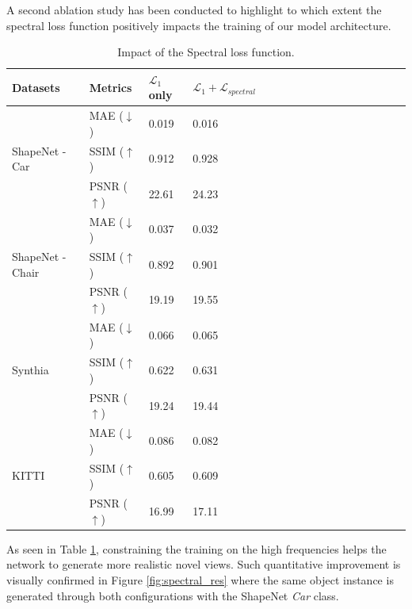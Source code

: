 A second ablation study has been conducted to highlight to which extent the spectral loss function positively impacts the training of our model architecture. 
\begin{table}[h!]
\begin{center}
\begin{tabular}{@{}||lllllllllllllllll@{}}
  \toprule
  Datasets & Metrics  &$\mathcal{L}_{1}$ only  &  $\mathcal{L}_{1}+\mathcal{L}_{spectral}$ &   \\
  \midrule
  \multirow{3}{*}{ShapeNet - Car \citep{chang2015shapenet}} & MAE ($\downarrow$) &\hfil 0.019 & \hfil  \cellcolor{red!25}0.016 \\
  & SSIM ($\uparrow$) & \hfil0.912 & \hfil \cellcolor{red!25}0.928\\
  & PSNR ($\uparrow$)& \hfil22.61 & \hfil \cellcolor{red!25}24.23\\
  \midrule
  \multirow{3}{*}{ShapeNet - Chair \citep{chang2015shapenet}} & MAE ($\downarrow$) & \hfil 0.037 & \hfil \cellcolor{red!25}0.032\\
  & SSIM ($\uparrow$)&\hfil 0.892 & \hfil \cellcolor{red!25}0.901 \\
  & PSNR ($\uparrow$) & \hfil 19.19 & \hfil \cellcolor{red!25}19.55 \\
  \midrule
  \multirow{3}{*}{Synthia \citep{ros2016synthia}} & MAE ($\downarrow$)& \hfil 0.066 & \hfil \cellcolor{red!25}0.065\\
  & SSIM ($\uparrow$)& \hfil 0.622 & \hfil \cellcolor{red!25}0.631 \\
  & PSNR ($\uparrow$)& \hfil 19.24 & \hfil \cellcolor{red!25}19.44\\
  \midrule
  \multirow{3}{*}{KITTI \citep{geiger2012we}} & MAE ($\downarrow$)& \hfil 0.086 & \hfil \cellcolor{red!25}0.082\\
  & SSIM ($\uparrow$)& \hfil 0.605 & \hfil \cellcolor{red!25}0.609 \\
  & PSNR ($\uparrow$)& \hfil 16.99 & \hfil \cellcolor{red!25}17.11\\\hline

\end{tabular}
\end{center}
\caption{Impact of the Spectral loss function.}
\label{tab:spectral}
\end{table}

As seen in Table \ref{tab:spectral}, constraining the training on the high frequencies helps the network to generate more realistic novel views. Such quantitative improvement is visually confirmed in Figure \ref{fig:spectral_res} where the same object instance is generated through both configurations with the ShapeNet \textit{Car} class.\newline 

